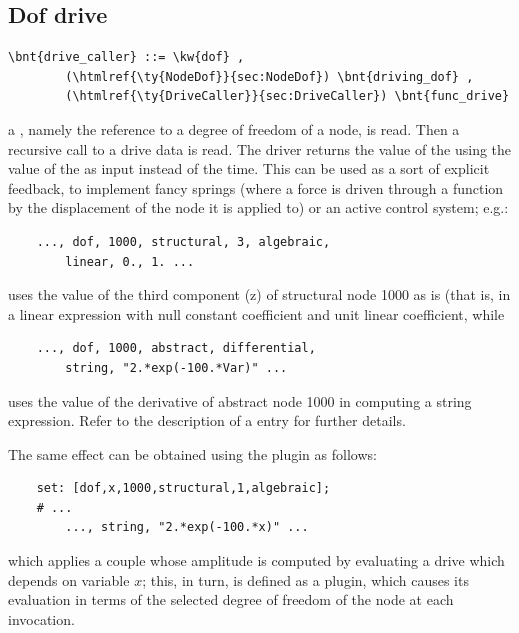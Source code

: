 \subsection{Dof drive}\label{sec:DriveCaller:DOF}
\begin{Verbatim}[commandchars=\\\{\}]
    \bnt{drive_caller} ::= \kw{dof} ,
        (\htmlref{\ty{NodeDof}}{sec:NodeDof}) \bnt{driving_dof} ,
        (\htmlref{\ty{DriveCaller}}{sec:DriveCaller}) \bnt{func_drive}
\end{Verbatim}
a , 
namely the reference to a degree of freedom of a node, is read. 
Then a recursive call to a drive data is read. 
The driver returns the value of the  
 using the value of the 
 as input instead of the time. 
This can be used as a sort of explicit feedback, to implement fancy
springs (where a force is driven through a function by the displacement
of the node it is applied to) or an active control system; e.g.:
\begin{verbatim}
    ..., dof, 1000, structural, 3, algebraic, 
        linear, 0., 1. ...
\end{verbatim}
uses the value of the third component (z) of structural node 1000 
as is (that is, in a linear expression with null constant coefficient 
and unit linear coefficient, while
\begin{verbatim}
    ..., dof, 1000, abstract, differential, 
        string, "2.*exp(-100.*Var)" ...
\end{verbatim}
uses the value of the derivative of abstract node 1000 in computing 
a string expression.
Refer to the description of a 
entry for further details.

The same effect can be obtained using the  plugin as follows:
\begin{verbatim}
    set: [dof,x,1000,structural,1,algebraic];
    # ...
        ..., string, "2.*exp(-100.*x)" ...
\end{verbatim}
which applies a couple whose amplitude is computed by evaluating
a  drive which depends on variable $x$; this, in turn,
is defined as a  plugin, which causes its evaluation
in terms of the selected degree of freedom of the node at each invocation.

